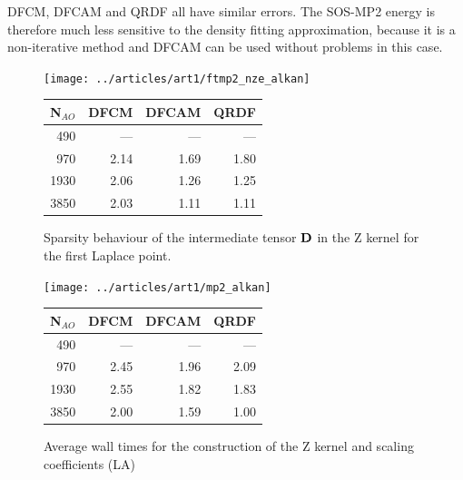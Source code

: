 DFCM, DFCAM and QRDF all have similar errors. The SOS-MP2 energy is therefore much less sensitive to the density fitting approximation, because it is a non-iterative method and DFCAM can be used without problems in this case. 

\begin{figure}
\begin{minipage}{0.5\textwidth}
\texttt{[image: ../articles/art1/ftmp2\_nze\_alkan]}
\end{minipage}
\begin{minipage}{0.4\textwidth}
\begin{tabular}{rrrr}
\hline
N$_{AO}$ & DFCM & DFCAM & QRDF \\ \hline
490 & --- & --- 	& --- \\ 
970	& 2.14 & 1.69 & 1.80 \\
1930	 & 2.06 & 1.26 & 1.25 \\
3850	 & 2.03 & 1.11 & 1.11 \\
 \hline
\end{tabular}
\end{minipage}
\caption{Sparsity behaviour of the intermediate tensor $\mathbf{D}$ in the Z kernel for the first Laplace point.}
\label{fig:GS_ZMEM_LA}
\end{figure}

\begin{figure}
\begin{minipage}{0.5\textwidth}
\centering
\texttt{[image: ../articles/art1/mp2\_alkan]}
\end{minipage}
\begin{minipage}{0.4\textwidth}
\centering
\begin{tabular}{rrrr}
\hline
N$_{AO}$ & DFCM & DFCAM & QRDF \\ \hline
490 & --- & --- 	& --- \\ 
970	& 2.45 & 1.96 & 2.09 \\
1930	 & 2.55 & 1.82 & 1.83 \\
3850	 & 2.00 & 1.59 & 1.00 \\
 \hline
\end{tabular}
\end{minipage}
\caption{Average wall times for the construction of the Z kernel and scaling coefficients (LA)}
\label{fig:GS_ZSCALE_LA}
\end{figure}

